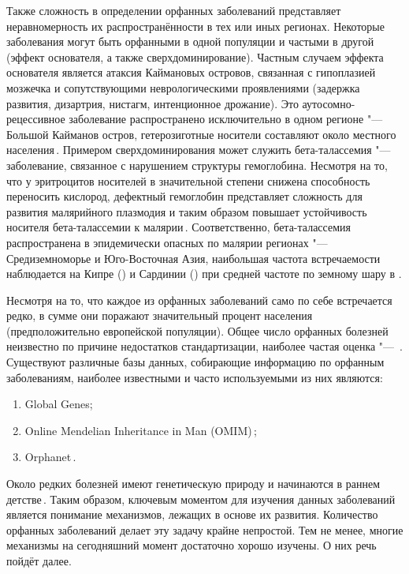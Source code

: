 \documentclass[a4paper,14pt]{extarticle}
\newcommand{\thousands}{тыс.}
\begin{document}
Также сложность в определении орфанных заболеваний представляет неравномерность их распространённости в тех или иных регионах.
Некоторые заболевания могут быть орфанными в одной популяции и частыми в другой (эффект основателя, а также сверхдоминирование).
Частным случаем эффекта основателя является атаксия Каймановых островов, связанная с гипоплазией мозжечка и сопутствующими неврологическими проявлениями (задержка развития, дизартрия, нистагм, интенционное дрожание).
Это аутосомно-рецессивное заболевание распространено исключительно в одном регионе "--- Большой Кайманов остров, гетерозиготные носители составляют около  местного населения\,\citep{Bomar_2003}.
Примером сверхдоминирования может служить бета-талассемия "--- заболевание, связанное с нарушением структуры гемоглобина.
Несмотря на то, что у эритроцитов носителей в значительной степени снижена способность переносить кислород, дефектный гемоглобин представляет сложность для развития малярийного плазмодия и таким образом повышает устойчивость носителя бета-талассемии к малярии\,\citep{Galanello_2010}.
Соответственно, бета-талассемия распространена в эпидемически опасных по малярии регионах "--- Средиземноморье и Юго-Восточная Азия, наибольшая частота встречаемости наблюдается на Кипре () и Сардинии () при средней частоте по земному шару в .

Несмотря на то, что каждое из орфанных заболеваний само по себе встречается редко, в сумме они поражают значительный процент населения (предположительно  европейской популяции).
Общее число орфанных болезней неизвестно по причине недостатков стандартизации, наиболее частая оценка "--- \numprint[\thousands]{5--8}\,\citep{The_Lancet_Neurology_2011}.
Существуют различные базы данных, собирающие информацию по орфанным заболеваниям, наиболее известными и часто используемыми из них являются:

\begin{enumerate}
	\item Global Genes;
	\item Online Mendelian Inheritance in Man (OMIM\textregistered)\,\citep{Amberger_2014};
	\item Orphanet\,\citep{Orphanet}.
\end{enumerate}

Около  редких болезней имеют генетическую природу и начинаются в раннем детстве\,\citep{The_Lancet_Neurology_2011}.
Таким образом, ключевым моментом для изучения данных заболеваний является понимание механизмов, лежащих в основе их развития.
Количество орфанных заболеваний делает эту задачу крайне непростой.
Тем не менее, многие механизмы на сегодняшний момент достаточно хорошо изучены.
О них речь пойдёт далее.
\end{document}
